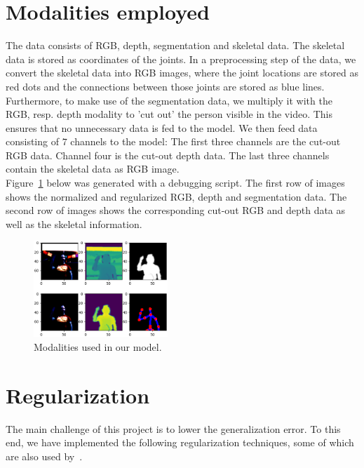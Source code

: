 \documentclass[sigconf]{acmart}
\begin{document}
	\section{Modalities employed}
	The data consists of RGB, depth, segmentation and skeletal data. The skeletal data is stored as coordinates of the joints. In a preprocessing step of the data, we convert the skeletal data into RGB images, where the joint locations are stored as red dots and the connections between those joints are stored as blue lines. Furthermore, to make use of the segmentation data, we multiply it with the RGB, resp. depth modality to 'cut out' the person visible in the video. This ensures that no unnecessary data is fed to the model. We then feed data consisting of $7$ channels to the model: The first three channels are the cut-out RGB data.  Channel four is the cut-out depth data. The last three channels contain the skeletal data as RGB image.\\
	
	Figure~\ref{fig:modalities} below was generated with a debugging script. The first row of images shows the normalized and regularized RGB, depth and segmentation data. The second row of images shows the corresponding cut-out RGB and depth data as well as the skeletal information.
	
	\begin{figure}[h!]
		\begin{center}
			\includegraphics[width=0.45\textwidth,height=0.45\textheight,keepaspectratio]{modalities.png}
		\end{center}
		\caption{Modalities used in our model.}
		\label{fig:modalities}
	\end{figure}
	
	\section{Regularization}\label{sct:5}
	The main challenge of this project is to lower the generalization error. To this end, we have implemented the following regularization techniques, some of which are also used by~\cite{pigou}.
	
\end{document}
